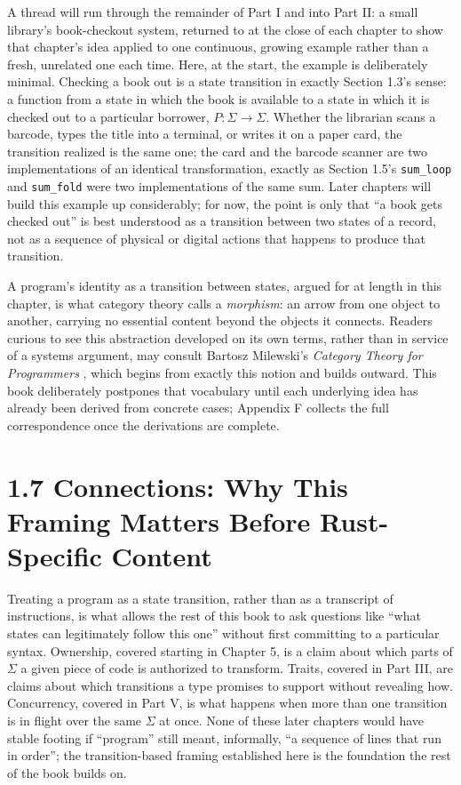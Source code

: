 \documentclass[11pt]{book}
\begin{document}
A thread will run through the remainder of Part I and into Part II: a small library's book-checkout system, returned to at the close of each chapter to show that chapter's idea applied to one continuous, growing example rather than a fresh, unrelated one each time. Here, at the start, the example is deliberately minimal. Checking a book out is a state transition in exactly Section 1.3's sense: a function from a state in which the book is available to a state in which it is checked out to a particular borrower, $P: \Sigma \rightarrow \Sigma$. Whether the librarian scans a barcode, types the title into a terminal, or writes it on a paper card, the transition realized is the same one; the card and the barcode scanner are two implementations of an identical transformation, exactly as Section 1.5's \texttt{sum\_loop} and \texttt{sum\_fold} were two implementations of the same sum. Later chapters will build this example up considerably; for now, the point is only that ``a book gets checked out'' is best understood as a transition between two states of a record, not as a sequence of physical or digital actions that happens to produce that transition.

\begin{categorybox}
A program's identity as a transition between states, argued for at length in this chapter, is what category theory calls a \emph{morphism}: an arrow from one object to another, carrying no essential content beyond the objects it connects. Readers curious to see this abstraction developed on its own terms, rather than in service of a systems argument, may consult Bartosz Milewski's \textit{Category Theory for Programmers} \cite{milewski2019}, which begins from exactly this notion and builds outward. This book deliberately postpones that vocabulary until each underlying idea has already been derived from concrete cases; Appendix F collects the full correspondence once the derivations are complete.
\end{categorybox}

\section*{1.7 Connections: Why This Framing Matters Before Rust-Specific Content}

Treating a program as a state transition, rather than as a transcript of instructions, is what allows the rest of this book to ask questions like ``what states can legitimately follow this one'' without first committing to a particular syntax. Ownership, covered starting in Chapter 5, is a claim about which parts of $\Sigma$ a given piece of code is authorized to transform. Traits, covered in Part III, are claims about which transitions a type promises to support without revealing how. Concurrency, covered in Part V, is what happens when more than one transition is in flight over the same $\Sigma$ at once. None of these later chapters would have stable footing if ``program'' still meant, informally, ``a sequence of lines that run in order''; the transition-based framing established here is the foundation the rest of the book builds on.
\end{document}
